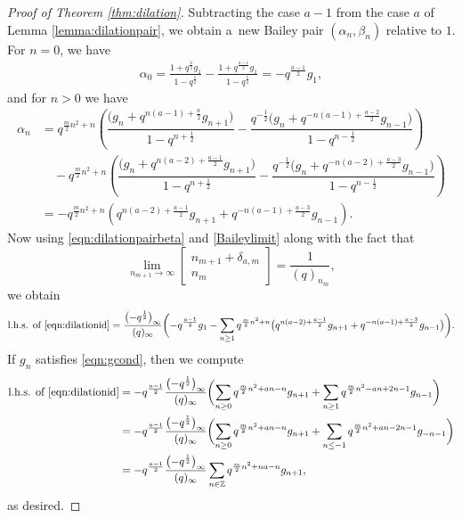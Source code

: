 \documentclass[pdftex]{sigma}
\numberwithin{equation}{section}
\begin{document}
\begin{proof}[Proof of Theorem \ref{thm:dilation}]
Subtracting the case $a-1$ from the case $a$ of Lemma \ref{lemma:dilationpair}, we obtain a~new Bailey pair $(\alpha_n,\beta_n)$ relative to $1$. For $n=0$, we have
\begin{align*}
	\alpha_0 = \frac{1+q^{\frac{a}{2}}g_1}{1-q^{\frac{1}{2}}} - \frac{1+q^{\frac{a-1}{2}}g_1}{1-q^{\frac{1}{2}}} = -q^{\frac{a-1}{2}}g_1,
\end{align*}
and for $n > 0$ we have
\begin{align*}
	\alpha_n &{}= q^{\frac{m}{2}n^2+n}\left( \dfrac{\bigl(g_n + q^{n(a-1)+ \frac{a}{2}}g_{n+1}\bigr)}{1-q^{n+\frac{1}{2}}} - \dfrac{q^{-\frac{1}{2}}\bigl(g_n + q^{-n(a-1) + \frac{a-2}{2}}g_{n-1}\bigr)}{1-q^{n - \frac{1}{2}}} \right) \\
	&\quad{}- q^{\frac{m}{2}n^2+n}\left( \dfrac{\bigl(g_n + q^{n(a-2)+ \frac{a-1}{2}}g_{n+1}\bigr)}{1-q^{n+\frac{1}{2}}} - \dfrac{q^{-\frac{1}{2}}\bigl(g_n + q^{-n(a-2) + \frac{a-3}{2}}g_{n-1}\bigr)}{1-q^{n - \frac{1}{2}}} \right) \\
	&{}= -q^{\frac{m}{2}n^2 +n}\left(q^{n(a-2) + \frac{a-1}{2}}g_{n+1} + q^{-n(a-1) +\frac{a-3}{2}}g_{n-1}\right).
\end{align*}
Now using \eqref{eqn:dilationpairbeta} and \eqref{Baileylimit} along with the fact that
\begin{equation*}
	\lim_{n_{m+1} \to \infty} \begin{bmatrix} n_{m+1} + \delta_{a,m} \\ n_m \end{bmatrix} = \frac{1}{(q)_{n_m}},
\end{equation*}
we obtain
\begin{align*}
	\text{l.h.s. of \eqref{eqn:dilationid}} = \frac{\bigl(-q^{\frac{1}{2}}\bigr)_{\infty}}{(q)_{\infty}}\biggl(-q^{\frac{a-1}{2}}g_1 - \sum_{n \geq 1}q^{\frac{m}{2}n^2+n}\bigl(q^{n(a-2) + \frac{a-1}{2}}g_{n+1} + q^{-n(a-1) +\frac{a-3}{2}}g_{n-1}\bigr)\biggr).
\end{align*}
If $g_n$ satisfies \eqref{eqn:gcond}, then we compute
\begin{align*}
	\text{l.h.s. of \eqref{eqn:dilationid}}
	&{}= -q^{\frac{a-1}{2}}\frac{\bigl(-q^{\frac{1}{2}}\bigr)_{\infty}}{(q)_{\infty}} \biggl(\sum_{n \geq 0} q^{\frac{m}{2}n^2 +an -n}g_{n+1} + \sum_{n \geq 1} q^{\frac{m}{2}n^2 -an + 2n - 1}g_{n-1}\biggr) \\
	&{}= -q^{\frac{a-1}{2}}\frac{\bigl(-q^{\frac{1}{2}}\bigr)_{\infty}}{(q)_{\infty}} \biggl(\sum_{n \geq 0} q^{\frac{m}{2}n^2 +an -n}g_{n+1} + \sum_{n \leq -1} q^{\frac{m}{2}n^2 +an - 2n - 1}g_{-n-1} \biggr) \\
	&{}= -q^{\frac{a-1}{2}} \frac{\bigl(-q^{\frac{1}{2}}\bigr)_{\infty}}{(q)_{\infty}} \sum_{n \in \mathbb{Z}} q^{\frac{m}{2}n^2+na-n}g_{n+1},
\end{align*}
as desired.
\end{proof}
\end{document}
